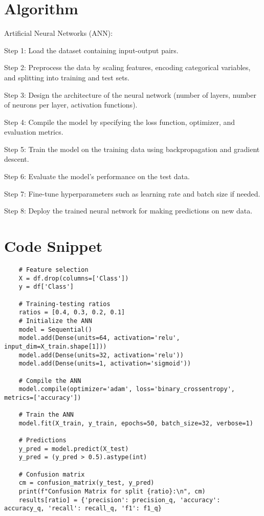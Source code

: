 \documentclass[12pt,a4paper]{report}
\begin{document}
\section{Algorithm}
Artificial Neural Networks (ANN): \par
Step 1: Load the dataset containing input-output pairs.\par
 Step 2: Preprocess the data by scaling features, encoding categorical variables, and splitting into training and test sets.\par
  Step 3: Design the architecture of the neural network (number of layers, number of neurons per layer, activation functions).\par
  Step 4: Compile the model by specifying the loss function, optimizer, and evaluation metrics.\par
   Step 5: Train the model on the training data using backpropagation and gradient descent.\par
   Step 6: Evaluate the model's performance on the test data.\par
  Step 7: Fine-tune hyperparameters such as learning rate and batch size if needed.\par
  Step 8: Deploy the trained neural network for making predictions on new data.\par

\section{Code Snippet}
\begin{lstlisting}
    # Feature selection
    X = df.drop(columns=['Class'])
    y = df['Class']

    # Training-testing ratios
    ratios = [0.4, 0.3, 0.2, 0.1]
    # Initialize the ANN
    model = Sequential()
    model.add(Dense(units=64, activation='relu', input_dim=X_train.shape[1]))
    model.add(Dense(units=32, activation='relu'))
    model.add(Dense(units=1, activation='sigmoid'))

    # Compile the ANN
    model.compile(optimizer='adam', loss='binary_crossentropy', metrics=['accuracy'])

    # Train the ANN
    model.fit(X_train, y_train, epochs=50, batch_size=32, verbose=1)

    # Predictions
    y_pred = model.predict(X_test)
    y_pred = (y_pred > 0.5).astype(int)

    # Confusion matrix
    cm = confusion_matrix(y_test, y_pred)
    print(f"Confusion Matrix for split {ratio}:\n", cm)
    results[ratio] = {'precision': precision_q, 'accuracy': accuracy_q, 'recall': recall_q, 'f1': f1_q}
\end{lstlisting}
\clearpage
\end{document}
